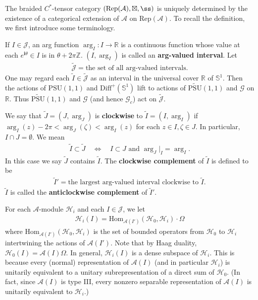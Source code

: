 \documentclass[11pt,b5paper,notitlepage]{article}
\theoremstyle{definition}
\theoremstyle{plain}
\newcommand{\mc}{\mathcal}
\newcommand{\wtd}{\widetilde}
\newcommand{\Hom}{\mathrm{Hom}}
\newcommand{\Rep}{\mathrm{Rep}}
\newcommand{\Diffp}{\mathrm{Diff}^+}
\newcommand{\PSU}{\mathrm{PSU}(1,1)}
\newcommand{\scr}{\mathscr}
\newcommand{\Jtd}{\widetilde{\mathcal J}}
\newcommand{\im}{\mathbf{i}}
\newcommand{\Zbb}{\mathbb Z}
\newcommand{\Rbb}{\mathbb R}
\newcommand{\UPSU}{\widetilde{\mathrm{PSU}}(1,1)}
\newcommand{\Sbb}{{\mathbb S}}
\newcommand{\Gc}{\mathscr G_c}
\numberwithin{equation}{section}
\begin{document}
The braided $C^*$-tensor category $(\Rep(\mc A),\boxtimes,\ss)$ is uniquely determined by the existence of a categorical extension of $\mc A$ on $\Rep(\mc A)$. To recall the definition, we first introduce some terminology.

If $I\in\mc J$, an arg function $\arg_I:I\rightarrow\Rbb$ is a continuous function whose value at each $e^{\im\theta}\in I$ is in $\theta+2\pi\Zbb$. $(I,\arg_I)$ is called an \textbf{arg-valued interval}. Let
\begin{align*}
\Jtd=\text{the set of all arg-valued intervals}.	
\end{align*}
One may regard each $\wtd I\in\Jtd$ as an interval in the universal cover $\Rbb$ of $\Sbb^1$. Then the actions of $\PSU$ and $\Diffp(\Sbb^1)$ lift to actions of $\UPSU$ and $\scr G$ on $\Rbb$. Thus $\UPSU$ and $\scr G$ (and hence $\Gc$) act on $\Jtd$.  

We say that $\wtd J=(J,\arg_J)$ is \textbf{clockwise} to $\wtd I=(I,\arg_I)$ if   $\arg_I(z)-2\pi<\arg_J(\zeta)<\arg_I(z)$ for each $z\in I,\zeta\in J$. In particular, $I\cap J=\emptyset$. We mean
\begin{align*}
\wtd I	\subset\wtd J\quad\Leftrightarrow\quad \text{$I\subset J$ and $\arg_J|_I=\arg_I$}.
\end{align*}
In this case we say $\wtd J$ contains $\wtd I$. The \textbf{clockwise complement} of $\wtd I$ is defined to be
\begin{align*}
	\wtd I'=\text{the largest arg-valued interval clockwise to $\wtd I$}.
\end{align*} 
$\wtd I$ is called the \textbf{anticlockwise complement} of $\wtd I'$.





For each $\mc A$-module $\mc H_i$ and each $I\in\mc J$, we let
\begin{align*}
\mc H_i(I)=\Hom_{\mc A(I')}(\mc H_0,\mc H_i)\cdot\Omega
\end{align*}
where $\Hom_{\mc A(I')}(\mc H_0,\mc H_i)$ is the set of bounded operators from $\mc H_0$ to $\mc H_i$ intertwining the actions of $\mc A(I')$. Note that by Haag duality, $\mc H_0(I)=\mc A(I)\Omega$. In general,  $\mc H_i(I)$ is a dense subspace of $\mc H_i$. This is because every (normal) representation of $\mc A(I)$ (and in particular $\mc H_i$) is unitarily equivalent to a unitary subrepresentation of a direct sum of $\mc H_0$. (In fact, since $\mc A(I)$ is type III, every nonzero separable representation of $\mc A(I)$ is unitarily equivalent to $\mc H_i$.)
\end{document}
